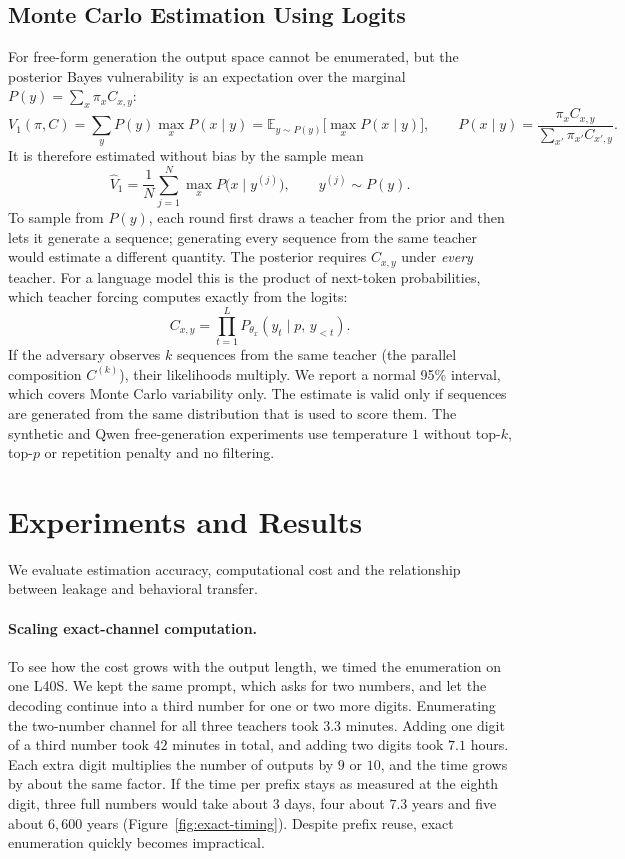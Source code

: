 \documentclass[11pt,a4paper]{article}
\begin{document}
\subsection{Monte Carlo Estimation Using Logits}
For free-form generation the output space cannot be enumerated, but the
posterior Bayes vulnerability is an expectation over the marginal
$P(y)=\sum_x\pi_xC_{x,y}$:
\begin{equation}\label{eq:expectation}
  V_1(\pi,C)=\sum_y P(y)\max_x P(x\mid y)
  =\mathbb E_{y\sim P(y)}\Big[\max_x P(x\mid y)\Big],
  \qquad
  P(x\mid y)=\frac{\pi_xC_{x,y}}{\sum_{x'}\pi_{x'}C_{x',y}}.
\end{equation}
It is therefore estimated without bias by the sample mean
\[
  \hat V_1=\frac1N\sum_{j=1}^{N}\max_x P\big(x\mid y^{(j)}\big),
  \qquad y^{(j)}\sim P(y).
\]
To sample from $P(y)$, each round first draws a teacher from the prior and then
lets it generate a sequence; generating every sequence from the same teacher
would estimate a different quantity. The posterior requires $C_{x,y}$ under
\emph{every} teacher. For a language model this is the product of next-token
probabilities, which teacher forcing computes exactly from the logits:
\[
  C_{x,y}=\prod_{t=1}^{L}P_{\theta_x}\!\left(y_t\mid p,\,y_{<t}\right).
\]
If the adversary observes $k$ sequences from the same teacher (the parallel
composition $C^{(k)}$), their likelihoods multiply. We report a normal 95\%
interval, which covers Monte Carlo variability only. The estimate is valid
only if sequences are generated from the same distribution that is used to score
them. The synthetic and Qwen free-generation experiments use temperature
$1$ without top-$k$, top-$p$ or repetition penalty and no filtering.

\section{Experiments and Results}
We evaluate estimation accuracy, computational cost and the relationship
between leakage and behavioral transfer.

\paragraph{Scaling exact-channel computation.}
To see how the cost grows with the output length, we timed the enumeration
on one L40S. We kept the same prompt, which asks for two numbers, and let
the decoding continue into a third number for one or two more digits.
Enumerating the two-number channel for all three teachers took $3.3$ minutes.
Adding one digit of a third number took $42$ minutes in total, and adding
two digits took $7.1$ hours. Each extra digit multiplies the number of
outputs by $9$ or $10$, and the time grows by about the same factor.
If the time per prefix stays as measured at the eighth digit, three full
numbers would take about $3$ days, four about $7.3$ years and five about
$6{,}600$ years (Figure~\ref{fig:exact-timing}). Despite prefix reuse,
exact enumeration quickly becomes impractical.
\end{document}
